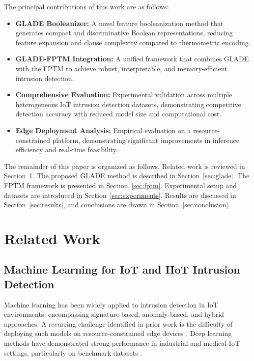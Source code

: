 \documentclass[journal,twoside,web]{ieeecolor}
\begin{document}
The principal contributions of this work are as follows:

\begin{itemize}
    \item \textbf{GLADE Booleanizer:} A novel feature booleanization method that generates compact and discriminative Boolean representations, reducing feature expansion and clause complexity compared to thermometric encoding.

    \item \textbf{GLADE-FPTM Integration:} A unified framework that combines GLADE with the FPTM to achieve robust, interpretable, and
    memory-efficient intrusion detection.

    \item \textbf{Comprehensive Evaluation:} Experimental validation across multiple heterogeneous IoT intrusion detection datasets,
    demonstrating competitive detection accuracy with reduced model size and computational cost.

    \item \textbf{Edge Deployment Analysis:} Empirical evaluation on a resource-constrained platform, demonstrating significant
    improvements in inference efficiency and real-time feasibility.
\end{itemize}

The remainder of this paper is organized as follows. Related work is reviewed in Section~\ref{sec:related}. The proposed GLADE method is
described in Section~\ref{sec:glade}. The FPTM framework is presented in Section~\ref{sec:fptm}. Experimental setup and datasets are
introduced in Section~\ref{sec:experiments}. Results are discussed in Section~\ref{sec:results}, and conclusions are drawn in Section~\ref{sec:conclusion}.


\section{Related Work}
\label{sec:related}

\subsection{Machine Learning for IoT and IIoT Intrusion Detection}

Machine learning has been widely applied to intrusion detection in
IoT environments, encompassing signature-based, anomaly-based, and
hybrid approaches. A recurring challenge identified in prior work is
the difficulty of deploying such models on resource-constrained edge
devices \cite{hussain2020ml, algaradi2020survey}. Deep learning
methods have demonstrated strong performance in industrial and
medical IoT settings, particularly on benchmark datasets
\cite{wang2023lightweight, jouhari2024lightweight, hady2020iomt}.
\end{document}
